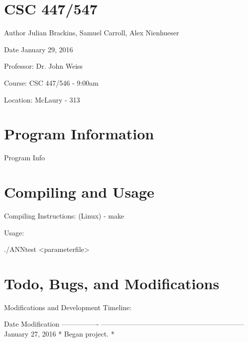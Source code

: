 \hypertarget{index_course_section}{}\section{C\-S\-C 447/547}\label{index_course_section}
\begin{DoxyAuthor}{Author}
Julian Brackins, Samuel Carroll, Alex Nienhueser
\end{DoxyAuthor}
\begin{DoxyDate}{Date}
January 29, 2016
\end{DoxyDate}
\begin{DoxyParagraph}{Professor\-:}
Dr. John Weiss
\end{DoxyParagraph}
\begin{DoxyParagraph}{Course\-:}
C\-S\-C 447/546 -\/ 9\-:00am
\end{DoxyParagraph}
\begin{DoxyParagraph}{Location\-:}
Mc\-Laury -\/ 313
\end{DoxyParagraph}
\hypertarget{index_program_section}{}\section{Program Information}\label{index_program_section}
Program Info\hypertarget{index_compile_section}{}\section{Compiling and Usage}\label{index_compile_section}
\begin{DoxyParagraph}{Compiling Instructions\-:}
(Linux) -\/ make
\end{DoxyParagraph}
\begin{DoxyParagraph}{Usage\-:}
\begin{DoxyVerb}./ANNtest <parameterfile>
\end{DoxyVerb}

\end{DoxyParagraph}
\hypertarget{index_todo_bugs_modification_section}{}\section{Todo, Bugs, and Modifications}\label{index_todo_bugs_modification_section}
\begin{DoxyParagraph}{Modifications and Development Timeline\-:}
\begin{DoxyVerb}Date              Modification
----------------  --------------------------------------------------------------
January 27, 2016  * Began project.
* 
\end{DoxyVerb}
 
\end{DoxyParagraph}
